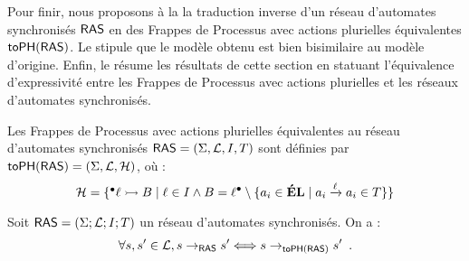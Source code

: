 Pour finir, nous proposons à la  la traduction inverse
d'un réseau d'automates synchronisés $\mathsf{RAS}$
en des Frappes de Processus avec actions plurielles équivalentes $\mathsf{toPH}(\mathsf{RAS})$.
Le  stipule que le modèle obtenu est bien bisimilaire
au modèle d'origine.
Enfin, le  résume les résultats de cette section
en statuant l'équivalence d'expressivité entre les Frappes de Processus avec
actions plurielles et les réseaux d'automates synchronisés.

\begin{definition}
  Les Frappes de Processus avec actions plurielles
  équivalentes au réseau d'automates synchronisés $\mathsf{RAS} = (\Sigma, \mathcal{L}, I, T)$
  sont définies par $\mathsf{toPH}(\mathsf{RAS}) = (\Sigma, \mathcal{L}, \mathcal{H})$, où :
  \[\mathcal{H} = \{ \mbox{${}^\bullet \ell \rightarrowtail B$} \mid \ell \in I \wedge
    B = \ell {}^\bullet \setminus \{ a_i \in \mathbf{\acute{E}L} \mid a_i \xrightarrow{\ell} a_i \in T \}
    \}\]
\end{definition}

\begin{theorem}[$\AN \approx \antophm$]
  Soit $\mathsf{RAS} = (\Sigma; \mathcal{L}; I; T)$ un réseau d'automates synchronisés.
  On a :
  \[\forall s, s' \in \mathcal{L}, s \rightarrow_{\mathsf{RAS}} s' \Longleftrightarrow s \rightarrow_{\mathsf{toPH}(\mathsf{RAS})} s' \enspace.\]
\end{theorem}

